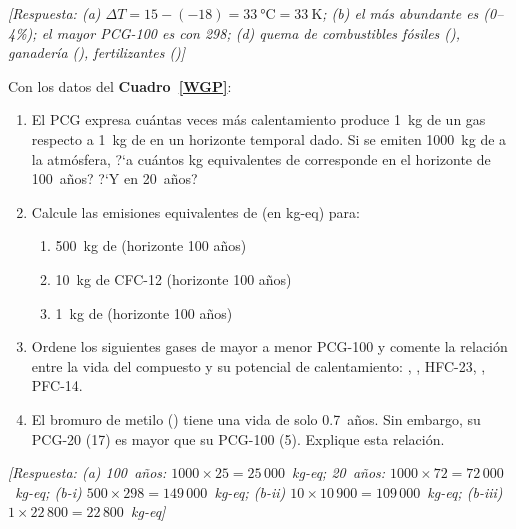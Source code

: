 \begin{bloque_ejercicios}
\begin{ejercicios}
\textit{[Respuesta:
(a) $\Delta T = 15 - (-18) = \SI{33}{\celsius} = \SI{33}{\kelvin}$;
(b) el m\'as abundante es  (0--4\%); el mayor PCG-100 es
     con 298;
(d) quema de combustibles f\'osiles (),
    ganader\'ia (), fertilizantes ()]}

\item Con los datos del \textbf{Cuadro~\ref{WGP}}:

\begin{enumerate}[label=\alph*)]
    \item El PCG expresa cu\'antas veces m\'as calentamiento
          produce 1~kg de un gas respecto a 1~kg de 
          en un horizonte temporal dado. Si se emiten
          \SI{1000}{\kilo\gram} de  a la atm\'osfera,
          ?`a cu\'antos kg equivalentes de  corresponde
          en el horizonte de 100~a\~nos? ?`Y en 20~a\~nos?

    \item Calcule las emisiones equivalentes de 
          (en kg-eq) para:
          \begin{enumerate}[label=\roman*)]
              \item \SI{500}{\kilo\gram} de 
                    (horizonte 100 a\~nos)
              \item \SI{10}{\kilo\gram} de CFC-12
                    (horizonte 100 a\~nos)
              \item \SI{1}{\kilo\gram} de 
                    (horizonte 100 a\~nos)
          \end{enumerate}

    \item Ordene los siguientes gases de mayor a menor PCG-100
          y comente la relaci\'on entre la vida del compuesto y
          su potencial de calentamiento:
          , , HFC-23, , PFC-14.

    \item El bromuro de metilo () tiene una vida de
          solo 0.7~a\~nos. Sin embargo, su PCG-20 (17) es mayor
          que su PCG-100 (5). Explique esta relaci\'on.
\end{enumerate}

\textit{[Respuesta:
(a) 100~a\~nos: $1000 \times 25 = 25\,000$~kg-eq;
    20~a\~nos: $1000 \times 72 = 72\,000$~kg-eq;
(b-i) $500 \times 298 = 149\,000$~kg-eq;
    (b-ii) $10 \times 10\,900 = 109\,000$~kg-eq;
    (b-iii) $1 \times 22\,800 = 22\,800$~kg-eq]}


\end{ejercicios}
\end{bloque_ejercicios}
